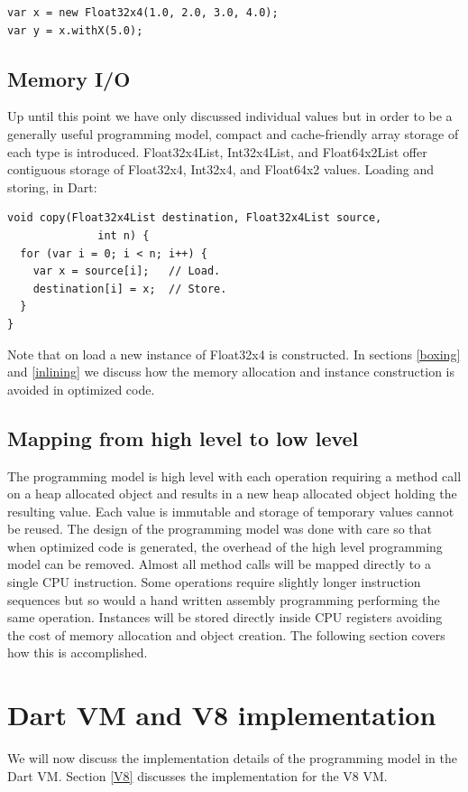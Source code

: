 \documentclass[preprint]{sigplanconf}
\begin{document}
\begin{verbatim}
var x = new Float32x4(1.0, 2.0, 3.0, 4.0);
var y = x.withX(5.0);
\end{verbatim}

\subsection{Memory I/O}
Up until this point we have only discussed individual values but in order to be a generally useful programming model, compact and cache-friendly array storage of each type is introduced. Float32x4List, Int32x4List, and Float64x2List offer contiguous storage of Float32x4, Int32x4, and Float64x2 values. Loading and storing, in Dart:

\begin{verbatim}
void copy(Float32x4List destination, Float32x4List source,
	          int n) {
  for (var i = 0; i < n; i++) {
    var x = source[i];   // Load.
    destination[i] = x;  // Store.
  }
}
\end{verbatim}

Note that on load a new instance of Float32x4 is constructed. In sections \ref{boxing} and \ref{inlining} we discuss how the memory allocation and instance construction is avoided in optimized code.

\subsection{Mapping from high level to low level}
The programming model is high level with each operation requiring a method call on a heap allocated object and results in a new heap allocated object holding the resulting value. Each value is immutable and storage of temporary values cannot be reused. The design of the programming model was done with care so that when optimized code is generated, the overhead of the high level programming model can be removed. Almost all method calls will be mapped directly to a single CPU instruction. Some operations require slightly longer instruction sequences but so would a hand written assembly programming performing the same operation. Instances will be stored directly inside CPU registers avoiding the cost of memory allocation and object creation. The following section covers how this is accomplished.

\section{Dart VM and V8 implementation}
We will now discuss the implementation details of the programming model in the Dart VM. Section \ref{V8} discusses the implementation for the V8 VM.
\end{document}
